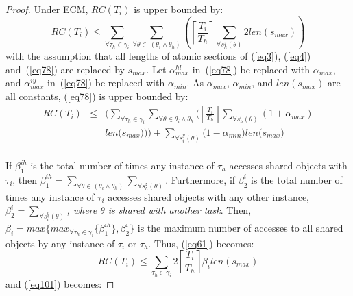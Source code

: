 \documentclass[12pt,english]{report}
\newtheorem{proof}{Proof}
\begin{document}
\begin{proof}\normalfont
Under ECM, $RC(T_{i})$ is upper bounded by:
\begin{equation}
RC(T_{i})\le\sum_{\forall \tau_{h}\in\gamma_{i}}\sum_{\forall \theta\in\ (\theta_{i}\wedge\theta_{h})}\left(\left\lceil\frac{T_{i}}{T_{h}}\right\rceil\sum_{\forall s_{h}^{z}(\theta)}2len(s_{max})\right)\label{eq61}\end{equation}
with the assumption that all lengths of atomic sections of (\ref{eq3}), (\ref{eq4}) and~(\ref{eq78}) are replaced by $s_{max}$.
Let $\alpha_{max}^{hl}$ in~(\ref{eq78}) be replaced with $\alpha_{max}$, and $\alpha_{max}^{iy}$ in~(\ref{eq78}) be replaced with $\alpha_{min}$. 
As $\alpha_{max}$, $\alpha_{min}$, and $len(s_{max})$ are all constants, (\ref{eq78}) is upper bounded by:
\begin{eqnarray}
RC(T_i) & \le & \Bigg(\sum_{\forall \tau_h \in \gamma_i}\sum_{\forall\theta \in \theta_i \wedge \theta_h}\Bigg(\left\lceil\frac{T_{i}}{T_{h}}\right\rceil\sum_{\forall s_{h}^{l}(\theta)}\left(1+\alpha_{max}\right)\nonumber\\
& & len\Big(s_{max}\Big)\Bigg)\Bigg)
 +  \sum_{\forall s_{i}^{y}(\theta)}\Big(1-\alpha_{min}\Big)len\Big(s_{max}\Big)\nonumber\\ 
\label{eq101}\end{eqnarray}

If $\beta_1^{ih}$ is the total number of times any instance of $\tau_h$ accesses shared objects with $\tau_i$, then $\beta_1^{ih}=\sum_{\forall \theta\in(\theta_{i}\wedge\theta_{h})}\sum_{\forall s_{h}^{z}(\theta)}$. Furthermore, if $\beta_2^i$ is the total number of times any instance of $\tau_i$ accesses shared objects with any other instance,   $\beta_2^i=\sum_{\forall s_{i}^{y}(\theta)}$\textit{, where $\theta$ is shared with another task}. Then, $\beta_{i}=max\{max_{\forall \tau_h \in \gamma_i}\{\beta_1^{ih}\},\beta_2^i\}$ is the maximum number of accesses to all shared objects by any instance of $\tau_{i}$ or $\tau_{h}$. 
Thus, (\ref{eq61}) becomes:
\begin{equation}
RC(T_{i})\le\sum_{\tau_{h}\in\gamma_{i}}2\left\lceil\frac{T_{i}}{T_{h}}\right\rceil\beta_{i}len(s_{max})
\label{eq63}\end{equation}
and (\ref{eq101}) becomes:


\end{proof}
\end{document}
